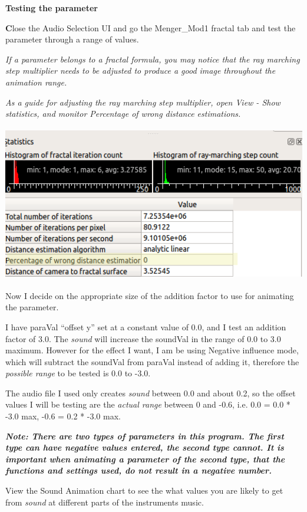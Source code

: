 \textbf{Testing the parameter}

\textbf{C}lose the Audio Selection UI and go the Menger\_Mod1 fractal
tab and test the parameter through a range of values.

\emph{If a parameter belongs to a fractal formula, you may notice that
the ray marching step multiplier needs to be adjusted to produce a good
image throughout the animation range.}

\emph{As a guide for adjusting the ray marching step multiplier, open
View - Show statistics, and monitor Percentage of wrong distance
estimations.}

\includegraphics[width=5.40827in,height=2.67087in]{img/sound/media/image7.png}

Now I decide on the appropriate size of the addition factor to use for
animating the parameter.

I have paraVal ``offset y'' set at a constant value of 0.0, and I test
an addition factor of 3.0. The \emph{sound} will increase the soundVal
in the range of 0.0 to 3.0 maximum. However for the effect I want, I am
be using Negative influence mode, which will subtract the soundVal from
paraVal instead of adding it, therefore the \emph{possible range} to be
tested is 0.0 to -3.0.

The audio file I used only creates \emph{sound} between 0.0 and about
0.2, so the offset values I will be testing are the \emph{actual range}
between 0 and -0.6, i.e. 0.0 = 0.0 * -3.0 max, -0.6 = 0.2 * -3.0 max.

\textbf{\emph{Note: There are two types of parameters in this program.
The first type can have negative values entered, the second type cannot.
It is \emph{important}} \emph{when animating a parameter of the second
type, that the functions and settings used, do not result in a negative
number.}}

View the Sound Animation chart to see the what values you are likely to
get from \emph{sound} at different parts of the instruments music.

